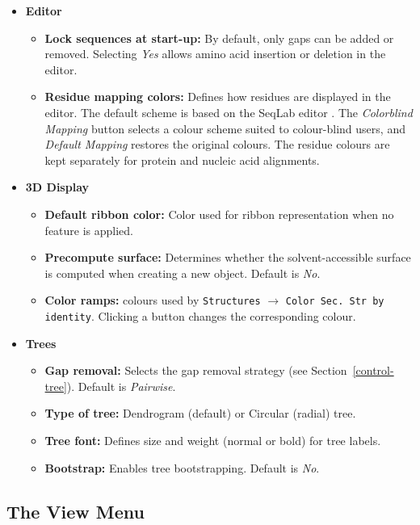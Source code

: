 \documentclass[a4paper]{article}
\begin{document}
\begin{itemize}
\item \textbf{Editor}
\begin{itemize}
\item \textbf{Lock sequences at start-up:} By default, only gaps can be added or removed. Selecting \textit{Yes} allows amino acid insertion or deletion in the editor.
\item \textbf{Residue mapping colors:} Defines how residues are displayed in the editor. The default scheme is based on the SeqLab editor \cite{soft:seqlab}. The \textit{Colorblind Mapping} button selects a colour scheme suited to colour-blind users, and \textit{Default Mapping} restores the original colours. The residue colours are kept separately for protein and nucleic acid alignments.
\end{itemize}

\item \textbf{3D Display}
\begin{itemize}
\item \textbf{Default ribbon color:} Color used for ribbon representation when no feature is applied.
\item \textbf{Precompute surface:} Determines whether the solvent-accessible surface is computed when creating a new object. Default is \textit{No}.
\item \textbf{Color ramps:} colours used by \texttt{Structures} $\rightarrow$ \texttt{Color Sec. Str by identity}. Clicking a button changes the corresponding colour.
\end{itemize}

\item \textbf{Trees}
\begin{itemize}
\item \textbf{Gap removal:} Selects the gap removal strategy (see Section~\ref{control-tree}). Default is \textit{Pairwise}.
\item \textbf{Type of tree:} Dendrogram (default) or Circular (radial) tree.
\item \textbf{Tree font:} Defines size and weight (normal or bold) for tree labels.
\item \textbf{Bootstrap:} Enables tree bootstrapping. Default is \textit{No}.
\end{itemize}
\end{itemize}


\subsection{The View Menu}
\end{document}
